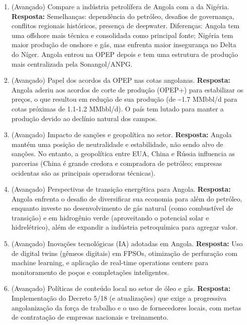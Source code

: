 \documentclass[11pt,a4paper]{article}
\begin{document}
\begin{enumerate}
  \item (Avançado) Compare a indústria petrolífera de Angola com a da Nigéria.
  \textbf{Resposta:} Semelhanças: dependência do petróleo, desafios de governança, conflitos regionais históricos, presença de deepwater. Diferenças: Angola tem uma offshore mais técnica e consolidada como principal fonte; Nigéria tem maior produção de onshore e gás, mas enfrenta maior insegurança no Delta do Níger. Angola entrou na OPEP depois e tem uma estrutura de produção mais centralizada pela Sonangol/ANPG.

  \item (Avançado) Papel dos acordos da OPEP nas cotas angolanas.
  \textbf{Resposta:} Angola aderiu aos acordos de corte de produção (OPEP+) para estabilizar os preços, o que resultou em redução de sua produção (de \textasciitilde1.7 MMbbl/d para cotas próximas de 1.1-1.2 MMbbl/d). O país tem lutado para manter a produção devido ao declínio natural dos campos.

  \item (Avançado) Impacto de sanções e geopolítica no setor.
  \textbf{Resposta:} Angola mantém uma posição de neutralidade e estabilidade, não sendo alvo de sanções. No entanto, a geopolítica entre EUA, China e Rússia influencia as parcerias (China é grande credora e compradora de petróleo; empresas ocidentas são as principais operadoras técnicas).

  \item (Avançado) Perspectivas de transição energética para Angola.
  \textbf{Resposta:} Angola enfrenta o desafio de diversificar sua economia para além do petróleo, enquanto investe no desenvolvimento de gás natural (como combustível de transição) e em hidrogênio verde (aproveitando o potencial solar e hidrelétrico), além de expandir a indústria petroquímica para agregar valor.

  \item (Avançado) Inovações tecnológicas (IA) adotadas em Angola.
  \textbf{Resposta:} Uso de digital twins (gêmeos digitais) em FPSOs, otimização de perfuração com machine learning, e aplicação de real-time operations centers para monitoramento de poços e completações inteligentes.

  \item (Avançado) Políticas de conteúdo local no setor de óleo e gás.
  \textbf{Resposta:} Implementação do Decreto 5/18 (e atualizações) que exige a progressiva angolanização da força de trabalho e o uso de fornecedores locais, com metas de contratação de empresas nacionais e treinamento.


\end{enumerate}
\end{document}
